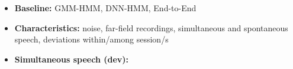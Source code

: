 \documentclass{beamer}
\newcommand{\transparency}{0.9}  %
\begin{document}
\begin{frame}
\begin{minipage}[t]{0.49\textwidth}
  \end{minipage}
  \hfill
  \pause
  \begin{minipage}[t]{0.5\textwidth}

  \begin{itemize}
    \item \textbf{Baseline:} GMM-HMM, DNN-HMM, End-to-End
    
    {\scriptsize
    
    }
    \item \textbf{Characteristics:} \textcolor{tug_red}{noise}, \textcolor{tug_red}{far-field recordings}, \textcolor{tug_red}{simultaneous and spontaneous speech}, \textcolor{tug_red}{deviations within/among session/s} 
    \item \textbf{Simultaneous speech (dev):}
  \end{itemize}
    \vspace{-1em}
  \begin{figure}
    \centering
  \end{figure}
 
  \end{minipage}  
  
\end{frame}



\end{document}
